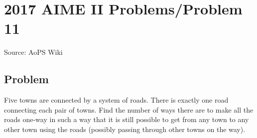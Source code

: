 \documentclass[12pt]{article}
\begin{document}
\section*{{2017 AIME II Problems/Problem 11}}
Source: AoPS Wiki

\subsection*{Problem}
Five towns are connected by a system of roads. There is exactly one road connecting each pair of towns. Find the number of ways there are to make all the roads one-way in such a way that it is still possible to get from any town to any other town using the roads (possibly passing through other towns on the way).
\end{document}
